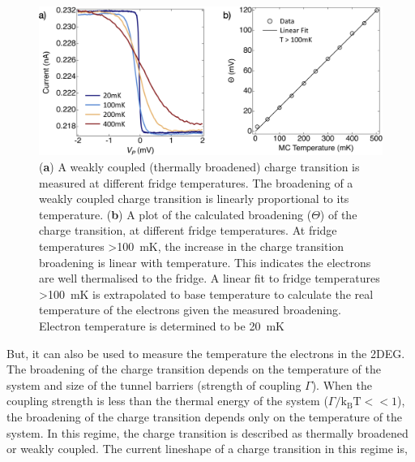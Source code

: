 \begin{figure}[!htb]
 \begin{center}
  \includegraphics[width=1.0\textwidth]{figures/ch1/crop_FiguresMaster.007.png}
  \caption[Calculating the electron temperature]{\label{fig:ch1/electron_temp} 
  (\textbf{a}) A weakly coupled (thermally broadened) charge transition is measured at different fridge temperatures. The broadening of a weakly coupled charge transition is linearly proportional to its temperature. (\textbf{b}) A plot of the calculated broadening ($\Theta$) of the charge transition, at different fridge temperatures. At fridge temperatures \qty{>100}{mK}, the increase in the charge transition broadening is linear with temperature. This indicates the electrons are well thermalised to the fridge. A linear fit to fridge temperatures \qty{>100}{mK} is extrapolated to base temperature to calculate the real temperature of the electrons given the measured broadening. Electron temperature is determined to be \qty{20}{mK}
   }
 \end{center}
\end{figure}



But, it can also be used to measure the temperature the electrons in the 2DEG. The broadening of the charge transition depends on the temperature of the system and size of the tunnel barriers (strength of coupling $\Gamma$). When the coupling strength is less than the thermal energy of the system ($\Gamma/\mathrm{k_BT} << 1$), the broadening of the charge transition depends only on the temperature of the system. In this regime, the charge transition is described as thermally broadened or weakly coupled. The current lineshape of a charge transition in this regime is,


